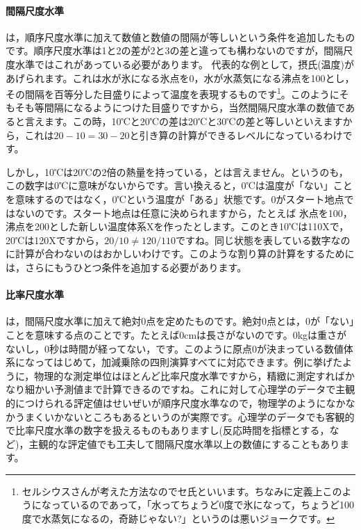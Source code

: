 \documentclass{ltjsbook}
\begin{document}
\paragraph{間隔尺度水準}
は，順序尺度水準に加えて数値と数値の間隔が等しいという条件を追加したものです。順序尺度水準は1と2の差が2と3の差と違っても構わないのですが，間隔尺度水準ではこれがあっている必要があります。
代表的な例として，摂氏(温度)があげられます。これは水が氷になる氷点を0，水が水蒸気になる沸点を100とし，その間隔を百等分した目盛りによって温度を表現するものです\footnote{セルシウスさんが考えた方法なのでセ氏といいます。ちなみに定義上このようになっているのであって，「水ってちょうど0度で氷になって，ちょうど100度で水蒸気になるの，奇跡じゃない?」というのは悪いジョークです。}。このようにそもそも等間隔になるようにつけた目盛りですから，当然間隔尺度水準の数値であると言えます。この時，10℃と20℃の差は20℃と30℃の差と等しいといえますから，これは$20-10=30-20$と引き算の計算ができるレベルになっているわけです。

しかし，10℃は20℃の2倍の熱量を持っている，とは言えません。というのも，この数字は0℃に意味がないからです。言い換えると，0℃は温度が「ない」ことを意味するのではなく，0℃という温度が「ある」状態です。0がスタート地点ではないのです。スタート地点は任意に決められますから，たとえば
氷点を100，沸点を200とした新しい温度体系Xを作ったとします。このとき10℃は110Xで，20℃は120Xですから，$20/10\neq 120/110$ですね。同じ状態を表している数字なのに計算が合わないのはおかしいわけです。このような割り算の計算をするためには，さらにもうひとつ条件を追加する必要があります。

\paragraph{比率尺度水準}
は，間隔尺度水準に加えて絶対0点を定めたものです。絶対0点とは，0が「ない」ことを意味する点のことです。たとえば0cmは長さがないのです。0kgは重さがないし，0秒は時間が経ってない，です。このように原点0が決まっている数値体系になってはじめて，加減乗除の四則演算すべてに対応できます。例に挙げたように，物理的な測定単位はほとんど比率尺度水準ですから，精緻に測定すればかなり細かい予測値まで計算できるのですね。これに対して心理学のデータで主観的につけられる評定値はせいぜいが順序尺度水準なので，物理学のようになかなかうまくいかないところもあるというのが実際です。心理学のデータでも客観的で比率尺度水準の数字を扱えるものもありますし(反応時間を指標とする，など)，主観的な評定値でも工夫して間隔尺度水準以上の数値にすることもあります。
\end{document}
